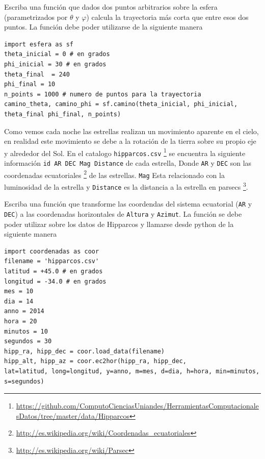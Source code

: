 \documentclass[11pt,letterpaper]{exam}
\begin{document}
\begin{questions}
Escriba una funci\'on que dados dos puntos arbitrarios sobre la
esfera (parametrizados por $\theta$ y $\varphi$) calcula la
trayectoria m\'as corta que entre esos dos puntos. La funci\'on debe
poder utilizarse de la siguiente manera 


\begin{verbatim}
import esfera as sf
theta_inicial = 0 # en grados
phi_inicial = 30 # en grados
theta_final  = 240
phi_final = 10 
n_points = 1000 # numero de puntos para la trayectoria
camino_theta, camino_phi = sf.camino(theta_inicial, phi_inicial,
theta_final phi_final, n_points)
\end{verbatim}

Como vemos cada noche las estrellas realizan un movimiento aparente en
el cielo, en realidad este movimiento se debe a la rotación de la
tierra sobre su propio eje y alrededor del Sol. En el catalogo
\verb+hipparcos.csv+ \footnote{\url{https://github.com/ComputoCienciasUniandes/HerramientasComputacionalesDatos/tree/master/data/Hipparcos}} 
se encuentra la siguiente información  \verb+id AR DEC Mag Distance+
de cada estrella, Donde  \verb+AR+ y \verb+DEC+ son las coordenadas
ecuatoriales \footnote{\url{http://es.wikipedia.org/wiki/Coordenadas_ecuatoriales}}
de las estrellas. \verb+Mag+ Esta relacionado con la luminosidad de la
estrella y \verb+Distance+ es la distancia a la estrella en
parsecs \footnote{\url{http://es.wikipedia.org/wiki/Parsec}}. 

Escriba una funci\'on que transforme las
coordendas del sistema ecuatorial (\verb+AR+ y \verb+DEC+) a las
coordenadas horizontales de \verb+Altura+ y \verb+Azimut+. La
funci\'on se debe poder utilizar sobre los datos de Hipparcos y
llamarse desde python de la siguiente manera 
\begin{verbatim}
import coordenadas as coor
filename = 'hipparcos.csv'
latitud = +45.0 # en grados
longitud = -34.0 # en grados
mes = 10
dia = 14
anno = 2014
hora = 20
minutos = 10
segundos = 30
hipp_ra, hipp_dec = coor.load_data(filename)
hipp_alt, hipp_az = coor.ec2hor(hipp_ra, hipp_dec, 
lat=latitud, long=longitud, y=anno, m=mes, d=dia, h=hora, min=minutos,
s=segundos)  
\end{verbatim}



\end{questions}
\end{document}
